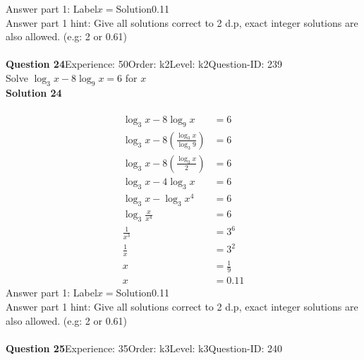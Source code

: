 \documentclass{article}
\begin{document}
Answer part 1: \hspace{10pt}Label\hspace{10pt}$x=$\hspace{10pt}Solution\hspace{10pt}0.11\\
Answer part 1 hint: \hspace{15pt}Give all solutions correct to 2 d.p, exact integer solutions are also allowed. (e.g: 2 or 0.61)\\
\\[4pt]
\noindent\textbf{Question 24}\hspace{20pt}Experience: 50\hspace{20pt}Order: k2\hspace{20pt}Level: k2\hspace{20pt}Question-ID: 239\\[2pt]
Solve $\log_{3}x-8\log_{9}x=6$ for $x$\\[4pt]
\noindent\textbf{Solution 24}\\[2pt]
\\[-35pt]\begin{align*}
\log_{3}x-8\log_{9}x&=6\\[2pt]
\log_{3}x-8\left(\displaystyle\frac{\log_{3}x}{\log_{3}9}\right)&=6\\[2pt]
\log_{3}x-8\left(\displaystyle\frac{\log_{3}x}{2}\right)&=6\\[2pt]
\log_{3}x-4\log_{3}x&=6\\[2pt]
\log_{3}x-\log_{3}x^4&=6\\[2pt]
\log_{3}\displaystyle\frac{x}{x^4}&=6\\[2pt]
\displaystyle\frac{1}{x^3}&=3^6\\[2pt]
\displaystyle\frac{1}{x}&=3^2\\[2pt]
x&=\displaystyle\frac{1}{9}\\[2pt]
x&=0.11
\end{align*}
Answer part 1: \hspace{10pt}Label\hspace{10pt}$x=$\hspace{10pt}Solution\hspace{10pt}0.11\\
Answer part 1 hint: \hspace{15pt}Give all solutions correct to 2 d.p, exact integer solutions are also allowed. (e.g: 2 or 0.61)\\
\\[4pt]
\noindent\textbf{Question 25}\hspace{20pt}Experience: 35\hspace{20pt}Order: k3\hspace{20pt}Level: k3\hspace{20pt}Question-ID: 240\\[2pt]
\end{document}
